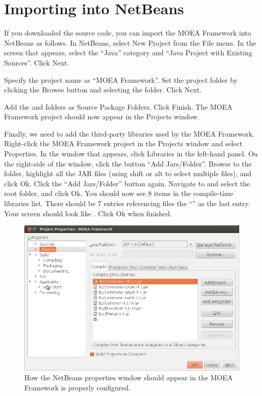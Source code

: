 \section{Importing into NetBeans}
If you downloaded the source code, you can import the MOEA Framework into NetBeans as follows.  In NetBeans, select New Project from the File menu.  In the screen that appears, select the ``Java'' category and ``Java Project with Existing Sources''.  Click Next.

Specify the project name as ``MOEA Framework''.  Set the project folder by clicking the Browse button and selecting the \folder{\moeaframework} folder.  Click Next.

Add the  and  folders as Source Package Folders.  Click Finish.  The MOEA Framework project should now appear in the Projects window.

Finally, we need to add the third-party libraries used by the MOEA Framework.  Right-click the MOEA Framework project in the Projects window and select Properties.  In the window that appears, click Libraries in the left-hand panel.  On the right-side of the window, click the button ``Add Jars/Folder''.  Browse to the  folder, highlight all the JAR files (using shift or alt to select multiple files), and click Ok.  Click the ``Add Jars/Folder'' button again.  Navigate to and select the root \folder{\moeaframework} folder, and click Ok.  You should now see $8$ items in the compile-time libraries list.  There should be $7$ entries referencing  files the ``'' as the last entry.  Your screen should look like .  Click Ok when finished.

\begin{figure}
  \center
  \includegraphics[width=.8\linewidth]{netbeans.png}
  \caption{How the NetBeans properties window should appear in the MOEA Framework is properly configured.}
  \label{fig:netbeans}
\end{figure}

